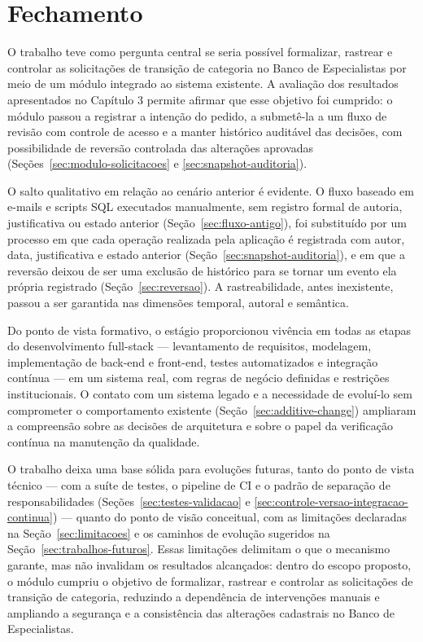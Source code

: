\section{Fechamento}
\label{sec:fechamento}

O trabalho teve como pergunta central se seria possível formalizar, 
rastrear e controlar as solicitações de transição de categoria no Banco 
de Especialistas por meio de um módulo integrado ao sistema existente. 
A avaliação dos resultados apresentados no Capítulo 3 permite afirmar 
que esse objetivo foi cumprido: o módulo passou a registrar a intenção 
do pedido, a submetê-la a um fluxo de revisão com controle de acesso e 
a manter histórico auditável das decisões, com possibilidade de 
reversão controlada das alterações aprovadas (Seções~\ref{sec:modulo-solicitacoes} e \ref{sec:snapshot-auditoria}).

O salto qualitativo em relação ao cenário anterior é evidente. O 
fluxo baseado em e-mails e scripts SQL executados manualmente, sem 
registro formal de autoria, justificativa ou estado anterior (Seção~\ref{sec:fluxo-antigo}), 
foi substituído por um processo em que cada operação realizada pela 
aplicação é registrada com autor, data, justificativa e estado anterior 
(Seção~\ref{sec:snapshot-auditoria}), e em que a reversão deixou de ser uma exclusão de histórico 
para se tornar um evento ela própria registrado (Seção~\ref{sec:reversao}). A 
rastreabilidade, antes inexistente, passou a ser garantida nas dimensões 
temporal, autoral e semântica.

Do ponto de vista formativo, o estágio proporcionou vivência em todas 
as etapas do desenvolvimento full-stack — levantamento de requisitos, 
modelagem, implementação de back-end e front-end, testes automatizados e 
integração contínua — em um sistema real, com regras de negócio definidas e 
restrições institucionais. O contato com um sistema legado e a necessidade 
de evoluí-lo sem comprometer o comportamento existente (Seção~\ref{sec:additive-change}) 
ampliaram a compreensão sobre as decisões de arquitetura e sobre o papel da 
verificação contínua na manutenção da qualidade.

O trabalho deixa uma base sólida para evoluções futuras, tanto do ponto 
de vista técnico — com a suíte de testes, o pipeline de CI e o padrão de 
separação de responsabilidades (Seções~\ref{sec:testes-validacao} e \ref{sec:controle-versao-integracao-continua}) — quanto do ponto de 
visão conceitual, com as limitações declaradas na Seção~\ref{sec:limitacoes} e os caminhos 
de evolução sugeridos na Seção~\ref{sec:trabalhos-futuros}. Essas limitações delimitam o que o 
mecanismo garante, mas não invalidam os resultados alcançados: dentro 
do escopo proposto, o módulo cumpriu o objetivo de formalizar, rastrear 
e controlar as solicitações de transição de categoria, reduzindo a 
dependência de intervenções manuais e ampliando a segurança e a consistência 
das alterações cadastrais no Banco de Especialistas.